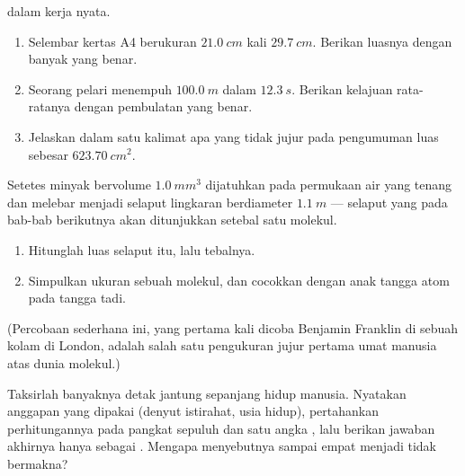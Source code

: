 \begin{exercise}[$\star\star$]\label{exo:g10:orders-of-magnitude:11}
 dalam kerja nyata.
\begin{enumerate}
  \item Selembar kertas A4 berukuran $\qty{21.0}{cm}$ kali
        $\qty{29.7}{cm}$. Berikan luasnya dengan banyak 
        yang benar.
  \item Seorang pelari menempuh $\qty{100.0}{m}$ dalam $\qty{12.3}{s}$.
        Berikan kelajuan rata-ratanya dengan pembulatan yang benar.
  \item Jelaskan dalam satu kalimat apa yang tidak jujur pada
        pengumuman luas sebesar $\qty{623.70}{cm^2}$.
\end{enumerate}
\end{exercise}

\begin{exercise}[$\star\star\star$]\label{exo:g10:orders-of-magnitude:12}
Setetes minyak bervolume $\qty{1.0}{mm^3}$ dijatuhkan pada permukaan
air yang tenang dan melebar menjadi selaput lingkaran berdiameter
$\qty{1.1}{m}$ --- selaput yang pada bab-bab berikutnya akan
ditunjukkan setebal satu molekul.
\begin{enumerate}
  \item Hitunglah luas selaput itu, lalu tebalnya.
  \item Simpulkan  ukuran sebuah molekul, dan cocokkan
        dengan anak tangga atom pada tangga tadi.
\end{enumerate}
(Percobaan sederhana ini, yang pertama kali dicoba Benjamin Franklin di
sebuah kolam di London, adalah salah satu pengukuran jujur pertama umat
manusia atas dunia molekul.)
\end{exercise}

\begin{exercise}[$\star\star\star$]\label{exo:g10:orders-of-magnitude:13}
Taksirlah banyaknya detak jantung sepanjang hidup manusia. Nyatakan
anggapan yang dipakai (denyut istirahat, usia hidup), pertahankan
perhitungannya pada pangkat sepuluh dan satu angka , lalu
berikan jawaban akhirnya hanya sebagai . Mengapa menyebutnya
sampai empat  menjadi tidak bermakna?
\end{exercise}

